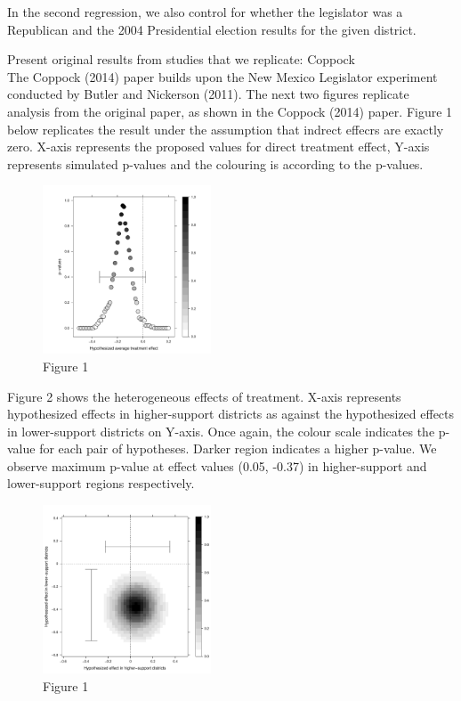 \documentclass[12pt]{article}
\begin{document}
In the second regression, we also control for whether the legislator was a Republican and the 2004 Presidential election results for the given district.





Present original results from studies that we replicate: Coppock \\

The Coppock (2014) paper builds upon the New Mexico Legislator experiment conducted by Butler and Nickerson (2011). The next two figures replicate analysis from the original paper, as shown in the Coppock (2014) paper. Figure 1 below replicates the result under the assumption that indrect effecrs are exactly zero. X-axis represents the proposed values for direct treatment effect, Y-axis represents simulated p-values and the colouring is according to the p-values.


\begin{figure}[H]
\centering
\includegraphics[height=5cm]{images/CoppockJEPS_figure1a.pdf}
\caption{Figure 1}
\end{figure}


Figure 2 shows the heterogeneous effects of treatment. X-axis represents hypothesized effects in higher-support districts as against the hypothesized effects in lower-support districts on Y-axis. Once again, the colour scale indicates the p-value for each pair of hypotheses. Darker region indicates a higher p-value. We observe maximum p-value at effect values (0.05, -0.37) in higher-support and lower-support regions respectively.


\begin{figure}[H]
\centering
\includegraphics[height=5cm]{images/CoppockJEPS_figure1b.pdf}
\caption{Figure 1}
\end{figure}
\end{document}
